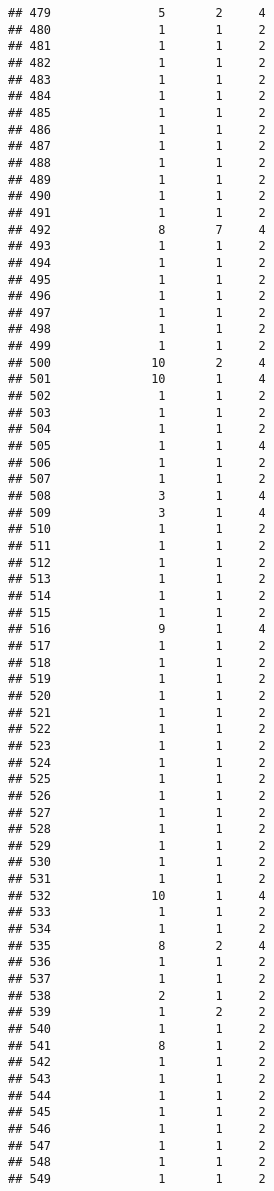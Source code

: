 \documentclass[
]{article}
\begin{document}
\begin{verbatim}
## 479               5       2     4
## 480               1       1     2
## 481               1       1     2
## 482               1       1     2
## 483               1       1     2
## 484               1       1     2
## 485               1       1     2
## 486               1       1     2
## 487               1       1     2
## 488               1       1     2
## 489               1       1     2
## 490               1       1     2
## 491               1       1     2
## 492               8       7     4
## 493               1       1     2
## 494               1       1     2
## 495               1       1     2
## 496               1       1     2
## 497               1       1     2
## 498               1       1     2
## 499               1       1     2
## 500              10       2     4
## 501              10       1     4
## 502               1       1     2
## 503               1       1     2
## 504               1       1     2
## 505               1       1     4
## 506               1       1     2
## 507               1       1     2
## 508               3       1     4
## 509               3       1     4
## 510               1       1     2
## 511               1       1     2
## 512               1       1     2
## 513               1       1     2
## 514               1       1     2
## 515               1       1     2
## 516               9       1     4
## 517               1       1     2
## 518               1       1     2
## 519               1       1     2
## 520               1       1     2
## 521               1       1     2
## 522               1       1     2
## 523               1       1     2
## 524               1       1     2
## 525               1       1     2
## 526               1       1     2
## 527               1       1     2
## 528               1       1     2
## 529               1       1     2
## 530               1       1     2
## 531               1       1     2
## 532              10       1     4
## 533               1       1     2
## 534               1       1     2
## 535               8       2     4
## 536               1       1     2
## 537               1       1     2
## 538               2       1     2
## 539               1       2     2
## 540               1       1     2
## 541               8       1     2
## 542               1       1     2
## 543               1       1     2
## 544               1       1     2
## 545               1       1     2
## 546               1       1     2
## 547               1       1     2
## 548               1       1     2
## 549               1       1     2

\end{verbatim}
\end{document}
